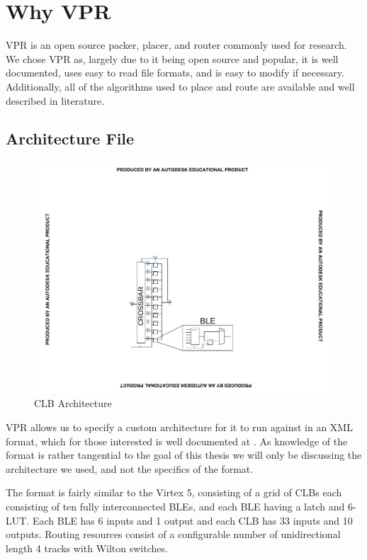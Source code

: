 \documentclass[12pt,drafta4paper,oneside]{memoir} %
\begin{document}
{\section{Why VPR}
\ac{VPR} is an open source packer, placer, and router commonly used for research. We chose \ac{VPR} as, largely due to it being open source and popular, it is well documented, uses easy to read file formats, and is easy to modify if necessary. Additionally, all of the algorithms used to place and route are available and well described in literature.

\subsection{Architecture File}
\begin{figure}
    \includegraphics[clip,trim=5cm 4cm 5cm 8cm]{images/CLB.pdf}
    \caption{CLB Architecture}
    \label{Arch}
\end{figure}
VPR allows us to specify a custom architecture for it to run against in an XML format, which for those interested is well documented at . As knowledge of the format is rather tangential to the goal of this thesis we will only be discussing the architecture we used, and not the specifics of the format.

The format is fairly similar to the Virtex 5, consisting of a grid of \acp{CLB} each consisting of ten fully interconnected \acp{BLE}, and each \ac{BLE} having a latch and 6-\ac{LUT}.
Each \ac{BLE} has 6 inputs and 1 output and each \ac{CLB} has 33 inputs and 10 outputs.
Routing resources consist of a configurable number of unidirectional length 4 tracks with \ac{Wilton} switches.

}
\end{document}
